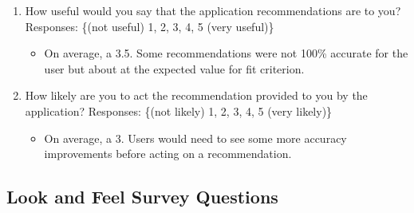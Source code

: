 \documentclass[12pt, titlepage]{article}
\begin{document}
\begin{enumerate}
  \item How useful would you say that the application recommendations are to you?
  Responses: \{(not useful) 1, 2, 3, 4, 5 (very useful)\} \\
    \begin{itemize}
      \item On average, a 3.5. Some recommendations were not 100\% accurate for the user but about at the
      expected value for fit criterion.
    \end{itemize}
  \item How likely are you to act the recommendation provided to you by the application?
  Responses: \{(not likely) 1, 2, 3, 4, 5 (very likely)\}
    \begin{itemize}
      \item On average, a 3. Users would need to see some more accuracy improvements before acting on a recommendation.
    \end{itemize}
\end{enumerate}

\subsection{Look and Feel Survey Questions}
\end{document}

